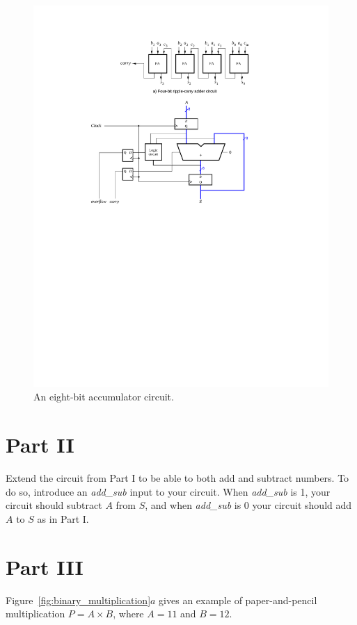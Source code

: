 \documentclass[epsfig,10pt,fullpage]{article}
\begin{document}
\begin{figure}[H]
\centerline{
\includegraphics{figures/accumulator}}
\caption{An eight-bit accumulator circuit.}
\label{fig:accumulator}
\end{figure}

\section*{Part II}
Extend the circuit from Part I to be able to both add and subtract numbers. To do so,
introduce an {\it add\_sub} input to your circuit. When {\it add\_sub} is 1, your circuit should
subtract $A$ from $S$, and when {\it add\_sub} is 0 your circuit should add 
$A$ to $S$ as in Part I.

\section*{Part III}
Figure~\ref{fig:binary_multiplication}$a$ gives an example of paper-and-pencil multiplication $P = A \times B$, where $A = 11$ and $B = 12$.
\end{document}

